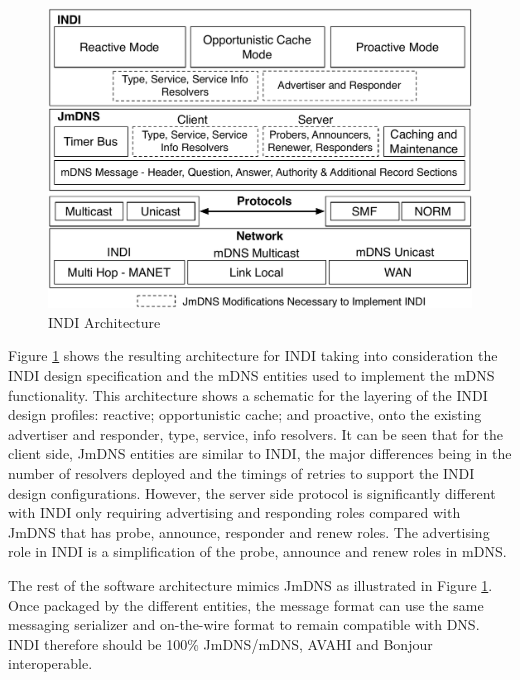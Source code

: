 \begin{figure}
\centering
\includegraphics[scale=0.55]{INDIArchitecture.pdf}
\caption{INDI Architecture} \label{indi:fig:architecture}
\end{figure}

Figure  \ref{indi:fig:architecture} shows the resulting architecture for INDI taking into consideration the INDI design specification and the mDNS entities used to implement the mDNS functionality.  This architecture shows a schematic for the layering of the INDI design profiles: reactive; opportunistic cache; and proactive, onto the existing advertiser and responder, type, service, info resolvers.     It can be seen that for the client side, JmDNS entities are similar to INDI, the major differences being in the number of resolvers deployed and the timings of retries to support the INDI design configurations.  However, the server side protocol is significantly different with INDI only requiring advertising and responding roles compared with JmDNS that has probe, announce, responder and renew roles.  The advertising role in INDI is a simplification of the probe, announce and renew roles in mDNS.

The rest of the software architecture mimics JmDNS as illustrated in Figure  \ref{indi:fig:architecture}. Once packaged by the different entities, the message format can use the same messaging serializer and on-the-wire format to remain compatible with DNS.  INDI therefore should be 100\% JmDNS/mDNS, AVAHI and Bonjour interoperable.   

